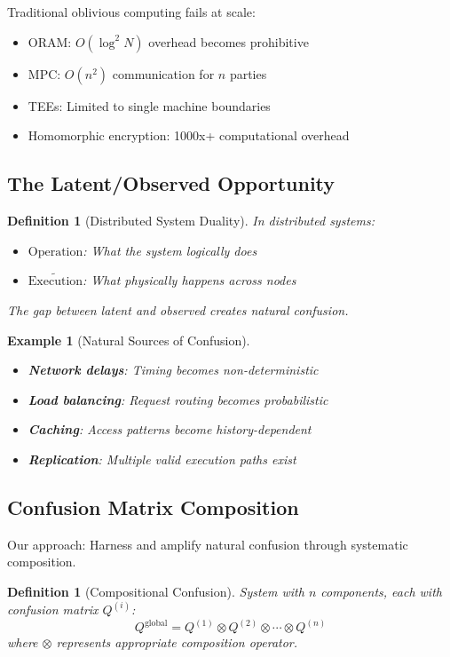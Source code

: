 \documentclass[11pt,final]{article}
\newcommand{\latent}[1]{#1}
\newcommand{\observed}[1]{\tilde{#1}}
\newtheorem{definition}[theorem]{Definition}
\newtheorem{example}[theorem]{Example}
\begin{document}
Traditional oblivious computing fails at scale:
\begin{itemize}
    \item ORAM: $O(\log^2 N)$ overhead becomes prohibitive
    \item MPC: $O(n^2)$ communication for $n$ parties
    \item TEEs: Limited to single machine boundaries
    \item Homomorphic encryption: 1000x+ computational overhead
\end{itemize}

\subsection{The Latent/Observed Opportunity}

\begin{definition}[Distributed System Duality]
In distributed systems:
\begin{itemize}
    \item $\latent{\text{Operation}}$: What the system logically does
    \item $\observed{\text{Execution}}$: What physically happens across nodes
\end{itemize}
The gap between latent and observed creates natural confusion.
\end{definition}

\begin{example}[Natural Sources of Confusion]
\begin{itemize}
    \item \textbf{Network delays}: Timing becomes non-deterministic
    \item \textbf{Load balancing}: Request routing becomes probabilistic
    \item \textbf{Caching}: Access patterns become history-dependent
    \item \textbf{Replication}: Multiple valid execution paths exist
\end{itemize}
\end{example}

\subsection{Confusion Matrix Composition}

Our approach: Harness and amplify natural confusion through systematic composition.

\begin{definition}[Compositional Confusion]
System with $n$ components, each with confusion matrix $Q^{(i)}$:
\begin{equation}
Q^{\text{global}} = Q^{(1)} \otimes Q^{(2)} \otimes \cdots \otimes Q^{(n)}
\end{equation}
where $\otimes$ represents appropriate composition operator.
\end{definition}
\end{document}
